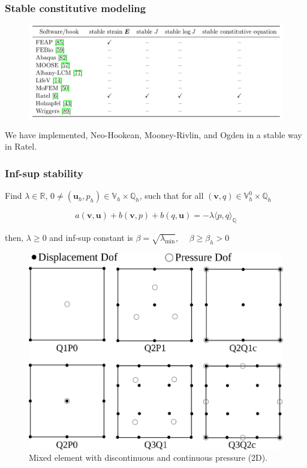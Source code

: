 \documentclass{beamer}
\begin{document}
\begin{frame}
	\frametitle{Stable constitutive modeling}
	\begin{figure} [h]
		\includegraphics[width=\textwidth]{../figs/table-constitutive.png}
	\end{figure}
	
	\vspace{10mm}
	{We have implemented, \alert{Neo-Hookean, Mooney-Rivlin}, and \alert{Ogden} in a stable way in Ratel.}
\end{frame}

\begin{frame}
	\frametitle{Inf-sup stability}

	Find $\lambda \in \mathbb{R}$, $0 \neq (\boldsymbol u_h, p_h) \in \mathbb{V}_h \times \mathbb{Q}_h $, such that for all $(\boldsymbol v, q) \in \mathbb{V}_h^0 \times \mathbb{Q}_h$

	\begin{equation*}
		a(\boldsymbol v, \boldsymbol u) + b(\boldsymbol v, p) + b(q, \boldsymbol u) = -\lambda \langle p, q \rangle_{\mathbb{Q}} 
	\end{equation*}
	
	then, $\lambda \geq 0$ and inf-sup constant is $\beta = \sqrt{\lambda_{\text{min}}}$, $\quad \beta \geq \beta_h >0$ 

	\vspace{5mm}
	\begin{figure}[h]
		\center\includegraphics[width=.4\textwidth]{../figs/mixed-element.png}
		\caption{Mixed element with discontinuous and continuous pressure (2D).}
	\end{figure}
\end{frame}
\end{document}
